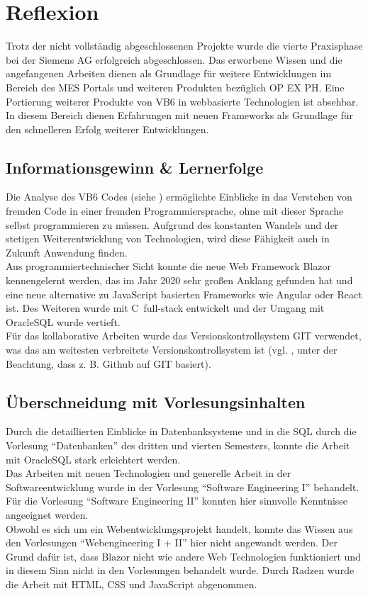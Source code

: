 \chapter{Reflexion}
Trotz der nicht vollständig abgeschlossenen Projekte wurde die vierte Praxisphase bei der Siemens AG erfolgreich abgeschlossen. Das erworbene Wissen und die angefangenen Arbeiten dienen als Grundlage für weitere Entwicklungen im Bereich des MES Portals und weiteren Produkten bezüglich \gls{OP EX PH}. Eine Portierung weiterer Produkte von \gls{VB}6 in webbasierte Technologien ist absehbar. In diesem Bereich dienen Erfahrungen mit neuen Frameworks als Grundlage für den schnelleren Erfolg weiterer Entwicklungen.

\section{Informationsgewinn \& Lernerfolge}
Die Analyse des \gls{VB}6 Codes (siehe ) ermöglichte Einblicke in das Verstehen von fremden Code in einer fremden Programmiersprache, ohne mit dieser Sprache selbst programmieren zu müssen. Aufgrund des konstanten Wandels und der stetigen Weiterentwicklung von Technologien, wird diese Fähigkeit auch in Zukunft Anwendung finden.\\
Aus programmiertechnischer Sicht konnte die neue Web Framework Blazor kennengelernt werden, das im Jahr 2020 sehr großen Anklang gefunden hat und eine neue alternative zu JavaScript basierten Frameworks wie Angular oder React ist. Des Weiteren wurde mit C\myHashtag\ \gls{full-stack} entwickelt und der Umgang mit OracleSQL wurde vertieft.\\
Für das kollaborative Arbeiten wurde das Versionskontrollsystem GIT verwendet, was das am weitesten verbreitete Versionskontrollsystem ist (vgl. \cite{datanyze.2020a}, unter der Beachtung, dass z. B. Github auf GIT basiert).

\section{Überschneidung mit Vorlesungsinhalten}
Durch die detaillierten Einblicke in Datenbanksysteme und in die \gls{SQL} durch die Vorlesung \enquote{Datenbanken} des dritten und vierten Semesters, konnte die Arbeit mit OracleSQL stark erleichtert werden.\\
Das Arbeiten mit neuen Technologien und generelle Arbeit in der Softwareentwicklung wurde in der Vorlesung \enquote{Software Engineering I} behandelt. Für die Vorlesung \enquote{Software Engineering II} konnten hier sinnvolle Kenntnisse angeeignet werden.\\
Obwohl es sich um ein Webentwicklungsprojekt handelt, konnte das Wissen aus den Vorlesungen \enquote{Webengineering I + II} hier nicht angewandt werden. Der Grund dafür ist, dass Blazor nicht wie andere Web Technologien funktioniert und in diesem Sinn nicht in den Vorlesungen behandelt wurde. Durch Radzen wurde die Arbeit mit HTML, CSS und JavaScript abgenommen.